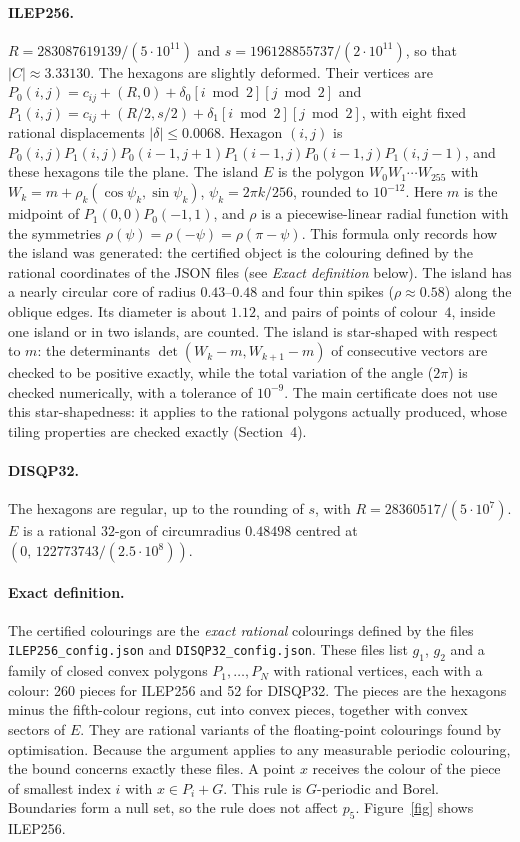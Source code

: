 \documentclass[10pt,a4paper]{article}
\begin{document}
\paragraph{ILEP256.} $R=283087619139/(5\cdot10^{11})$ and $s=196128855737/(2\cdot10^{11})$, so that
$|C|\approx3.33130$. The hexagons are slightly deformed. Their vertices are
$P_0(i,j)=c_{ij}+(R,0)+\delta_0[i\bmod2][j\bmod2]$ and $P_1(i,j)=c_{ij}+(R/2,s/2)+\delta_1[i\bmod2][j\bmod2]$,
with eight fixed rational displacements $|\delta|\le0.0068$. Hexagon $(i,j)$ is
$P_0(i,j)P_1(i,j)P_0(i{-}1,j{+}1)P_1(i{-}1,j)P_0(i{-}1,j)P_1(i,j{-}1)$, and these hexagons tile the plane.
The island $E$ is the polygon $W_0W_1\cdots W_{255}$ with
$W_k=m+\rho_k(\cos\psi_k,\sin\psi_k)$, $\psi_k=2\pi k/256$, rounded to $10^{-12}$. Here $m$ is the
midpoint of $P_1(0,0)P_0(-1,1)$, and $\rho$ is a piecewise-linear radial function with the symmetries
$\rho(\psi)=\rho(-\psi)=\rho(\pi-\psi)$. This formula only records how the island was generated: the certified object is the colouring
defined by the rational coordinates of the JSON files (see \emph{Exact definition} below). The island
has a nearly circular core of radius $0.43$--$0.48$
and four thin spikes ($\rho\approx0.58$) along the oblique edges. Its diameter is about $1.12$, and
pairs of points of colour~$4$, inside one island or in two islands, are counted. The island
is star-shaped with respect to $m$: the determinants $\det(W_k-m,W_{k+1}-m)$ of consecutive vectors are
checked to be positive exactly, while the total variation of the angle ($2\pi$) is checked numerically,
with a tolerance of $10^{-9}$. The main certificate does not use this star-shapedness: it applies to the
rational polygons actually produced, whose tiling properties are checked exactly (Section~4).

\paragraph{DISQP32.} The hexagons are regular, up to the rounding of $s$, with $R=28360517/(5\cdot10^7)$.
$E$ is a rational $32$-gon of circumradius $0.48498$ centred at $(0,\,122773743/(2.5\cdot10^8))$.

\paragraph{Exact definition.} The certified colourings are the \emph{exact rational} colourings
defined by the files \texttt{ILEP256\_config.json} and \texttt{DISQP32\_config.json}. These files
list $g_1$, $g_2$ and a family of closed convex polygons $P_1,\dots,P_N$ with rational vertices, each
with a colour: 260 pieces for ILEP256 and 52 for DISQP32. The pieces are the hexagons minus the
fifth-colour regions, cut into convex pieces, together with convex sectors of $E$. They are
rational variants of the floating-point colourings found by optimisation. Because the argument
applies to any measurable periodic colouring, the bound concerns exactly these files. A point $x$
receives the colour of the piece of smallest index $i$ with $x\in P_i+G$. This rule is $G$-periodic and
Borel. Boundaries form a null set, so the rule does not affect $p_5$.
Figure~\ref{fig} shows ILEP256.
\end{document}
